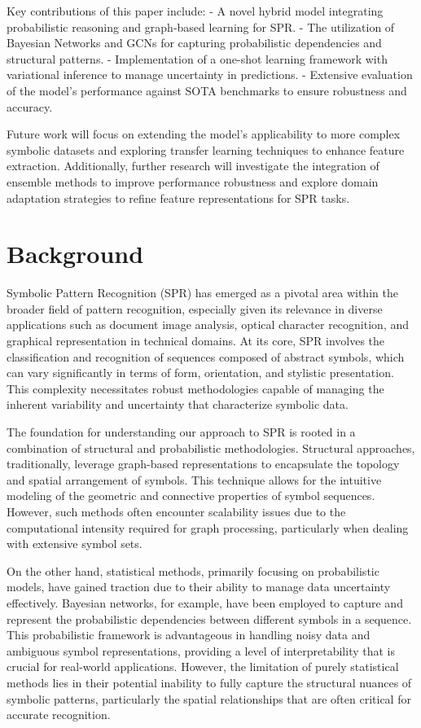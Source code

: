 \documentclass{article}
\begin{document}
Key contributions of this paper include:
- A novel hybrid model integrating probabilistic reasoning and graph-based learning for SPR.
- The utilization of Bayesian Networks and GCNs for capturing probabilistic dependencies and structural patterns.
- Implementation of a one-shot learning framework with variational inference to manage uncertainty in predictions.
- Extensive evaluation of the model's performance against SOTA benchmarks to ensure robustness and accuracy.

Future work will focus on extending the model's applicability to more complex symbolic datasets and exploring transfer learning techniques to enhance feature extraction. Additionally, further research will investigate the integration of ensemble methods to improve performance robustness and explore domain adaptation strategies to refine feature representations for SPR tasks.

\section{Background}
Symbolic Pattern Recognition (SPR) has emerged as a pivotal area within the broader field of pattern recognition, especially given its relevance in diverse applications such as document image analysis, optical character recognition, and graphical representation in technical domains. At its core, SPR involves the classification and recognition of sequences composed of abstract symbols, which can vary significantly in terms of form, orientation, and stylistic presentation. This complexity necessitates robust methodologies capable of managing the inherent variability and uncertainty that characterize symbolic data.

The foundation for understanding our approach to SPR is rooted in a combination of structural and probabilistic methodologies. Structural approaches, traditionally, leverage graph-based representations to encapsulate the topology and spatial arrangement of symbols. This technique allows for the intuitive modeling of the geometric and connective properties of symbol sequences. However, such methods often encounter scalability issues due to the computational intensity required for graph processing, particularly when dealing with extensive symbol sets.

On the other hand, statistical methods, primarily focusing on probabilistic models, have gained traction due to their ability to manage data uncertainty effectively. Bayesian networks, for example, have been employed to capture and represent the probabilistic dependencies between different symbols in a sequence. This probabilistic framework is advantageous in handling noisy data and ambiguous symbol representations, providing a level of interpretability that is crucial for real-world applications. However, the limitation of purely statistical methods lies in their potential inability to fully capture the structural nuances of symbolic patterns, particularly the spatial relationships that are often critical for accurate recognition.
\end{document}
